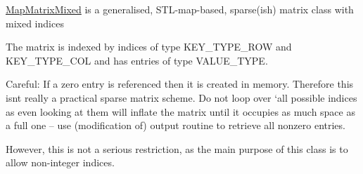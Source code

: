 \hyperlink{classoomph_1_1MapMatrixMixed}{Map\+Matrix\+Mixed} is a generalised, S\+T\+L-\/map-\/based, sparse(ish) matrix class with mixed indices

The matrix is indexed by indices of type K\+E\+Y\+\_\+\+T\+Y\+P\+E\+\_\+\+R\+OW and K\+E\+Y\+\_\+\+T\+Y\+P\+E\+\_\+\+C\+OL and has entries of type V\+A\+L\+U\+E\+\_\+\+T\+Y\+PE.

Careful\+: If a zero entry is referenced then it is created in memory. Therefore this isn\textquotesingle{}t really a practical sparse matrix scheme. Do not loop over `all\textquotesingle{} possible indices as even looking at them will inflate the matrix until it occupies as much space as a full one -- use (modification of) output routine to retrieve all nonzero entries.

However, this is not a serious restriction, as the main purpose of this class is to allow non-\/integer indices.

